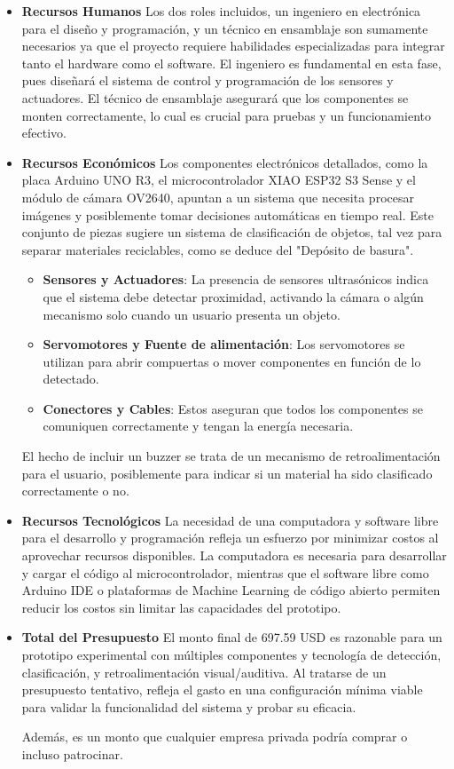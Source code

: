 \begin{itemize}
    \item \textbf{Recursos Humanos}  
    Los dos roles incluidos, un ingeniero en electrónica para el diseño y programación, y un técnico en ensamblaje son sumamente necesarios ya que el proyecto requiere habilidades especializadas para integrar tanto el hardware como el software. El ingeniero es fundamental en esta fase, pues diseñará el sistema de control y programación de los sensores y actuadores. El técnico de ensamblaje asegurará que los componentes se monten correctamente, lo cual es crucial para pruebas y un funcionamiento efectivo.

    \item \textbf{Recursos Económicos}  
    Los componentes electrónicos detallados, como la placa Arduino UNO R3, el microcontrolador XIAO ESP32 S3 Sense y el módulo de cámara OV2640, apuntan a un sistema que necesita procesar imágenes y posiblemente tomar decisiones automáticas en tiempo real. Este conjunto de piezas sugiere un sistema de clasificación de objetos, tal vez para separar materiales reciclables, como se deduce del "Depósito de basura".

    \begin{itemize}
        \item \textbf{Sensores y Actuadores}: La presencia de sensores ultrasónicos indica que el sistema debe detectar proximidad, activando la cámara o algún mecanismo solo cuando un usuario presenta un objeto.
        \item \textbf{Servomotores y Fuente de alimentación}: Los servomotores se utilizan para abrir compuertas o mover componentes en función de lo detectado.
        \item \textbf{Conectores y Cables}: Estos aseguran que todos los componentes se comuniquen correctamente y tengan la energía necesaria.
    \end{itemize}

    El hecho de incluir un buzzer se trata de un mecanismo de retroalimentación para el usuario, posiblemente para indicar si un material ha sido clasificado correctamente o no.

    \item \textbf{Recursos Tecnológicos}  
    La necesidad de una computadora y software libre para el desarrollo y programación refleja un esfuerzo por minimizar costos al aprovechar recursos disponibles. La computadora es necesaria para desarrollar y cargar el código al microcontrolador, mientras que el software libre como Arduino IDE o plataformas de Machine Learning de código abierto permiten reducir los costos sin limitar las capacidades del prototipo.

    \item \textbf{Total del Presupuesto}  
    El monto final de 697.59 USD es razonable para un prototipo experimental con múltiples componentes y tecnología de detección, clasificación, y retroalimentación visual/auditiva. Al tratarse de un presupuesto tentativo, refleja el gasto en una configuración mínima viable para validar la funcionalidad del sistema y probar su eficacia.

    Además, es un monto que cualquier empresa privada podría comprar o incluso patrocinar.
\end{itemize}
